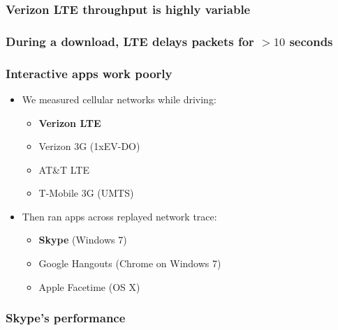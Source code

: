 \documentclass[svgnames]{beamer}
\begin{document}
\begin{frame}
\frametitle{Verizon LTE throughput is highly variable}

\begin{centering}

{\small
\def\svgwidth{\columnwidth}
}

\end{centering}

\end{frame}

\begin{frame}
\frametitle{During a download, LTE delays packets for $>10$ seconds}

\begin{centering}

{\small
\def\svgwidth{0.8 \columnwidth}
}

\end{centering}

\end{frame}

\begin{frame}
\frametitle{Interactive apps work poorly}

\begin{itemize}
\item We measured cellular networks while driving:

\begin{itemize}
\item {\color{red}\bf Verizon LTE}
\item Verizon 3G (1xEV-DO)
\item AT\&T LTE
\item T-Mobile 3G (UMTS)
\end{itemize}

\item Then ran apps across replayed network trace:

\begin{itemize}
\item {\color{red}\bf Skype} (Windows 7)
\item Google Hangouts (Chrome on Windows 7)
\item Apple Facetime (OS X)
\end{itemize}

\end{itemize}

\end{frame}

\begin{frame}
\frametitle{Skype's performance}

\end{frame}
\end{document}
